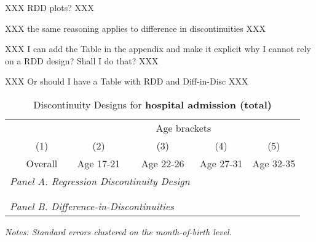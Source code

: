 {\color{red}
XXX RDD plots? XXX

XXX  the same reasoning applies to difference in discontinuities XXX

XXX I can add the Table in the appendix and make it explicit why I cannot rely on a RDD design?  Shall I do that? XXX

XXX Or should I have a Table with RDD and Diff-in-Disc XXX}


\begin{table}[H] \centering 
	\begin{threeparttable} \centering \caption{Discontinuity Designs for \textbf{hospital admission (total)}}\label{tab_mlch: revision_RDD_DiffDisc_hopsital2_total}
		{\def\sym#1{\ifmmode^{#1}\else\(^{#1}\)\fi} 
			\begin{tabular}{l*{5}{c}}
				\toprule 
				& & \multicolumn{4}{c}{Age brackets} \\ 
				\cmidrule(lr){3-6}
				&\multicolumn{1}{c}{(1)}&\multicolumn{1}{c}{(2)}&\multicolumn{1}{c}{(3)}&\multicolumn{1}{c}{(4)}&\multicolumn{1}{c}{(5)}\\
				&\multicolumn{1}{c}{Overall}&\multicolumn{1}{c}{Age 17-21}&\multicolumn{1}{c}{Age 22-26}&\multicolumn{1}{c}{Age 27-31} &\multicolumn{1}{c}{Age 32-35}\\
				\midrule
				\multicolumn{4}{l}{\emph{Panel A. Regression Discontinuity Design}} \\
				 \\ \\
				
				\multicolumn{4}{l}{\emph{Panel B. Difference-in-Discontinuities}} \\
				 
				\bottomrule 
		\end{tabular}}
		\begin{tablenotes} 
			\item \scriptsize \emph{Notes: Standard errors clustered on the month-of-birth level.} 
		\end{tablenotes} 
	\end{threeparttable} 
\end{table}






